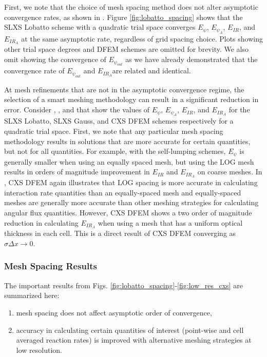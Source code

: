 First, we note that the choice of mesh spacing method does not alter asymptotic convergence rates, as shown in .  Figure \ref{fig:lobatto_spacing} shows that the SLXS Lobatto scheme with a quadratic trial space converges $E_{\psi}$, $E_{\psi_A}$, $E_{IR}$, and $E_{IR_A}$ at the same asymptotic rate, regardless of grid spacing choice.  Plots showing other trial space degrees and DFEM schemes are omitted for brevity.  We also omit showing the convergence of $E_{\psi_{out}}$ as we have already demonstrated that the convergence rate of $E_{\psi_{out}}$ and $E_{IR_A}$are related and identical.

At mesh refinements that are not in the asymptotic convergence regime, the selection of a smart meshing methodology can result in a significant reduction in error.  Consider , , and  that show the values of $E_{\psi}$, $E_{\psi_A}$, $E_{IR}$, and $E_{IR_A}$ for the SLXS Lobatto, SLXS Gauss, and CXS DFEM schemes respectively for a quadratic trial space.
First, we note that any particular mesh spacing methodology results in solutions that are more accurate for certain quantities, but not for all quantities.  
For example, with the self-lumping schemes, $E_{\psi}$ is generally smaller when using an equally spaced mesh, but using the LOG mesh results in orders of magnitude improvement in $E_{IR}$ and $E_{IR_A}$ on coarse meshes.
In , CXS DFEM again illustrates that LOG spacing is more accurate in calculating interaction rate quantities than an equally-spaced mesh and equally-spaced meshes are generally more accurate than other meshing strategies for calculating angular flux quantities.
However, CXS DFEM shows a two order of magnitude reduction in calculating $E_{IR_A}$ when using a mesh that has a uniform optical thickness in each cell.  This is a direct result of CXS DFEM converging as $\hat{\sigma} \Delta x \to 0$.


\subsubsection{Mesh Spacing Results}
\label{sec:mesh_results}
The important results from Figs. \ref{fig:lobatto_spacing}-\ref{fig:low_res_cxs} are summarized here:
\begin{enumerate}
\item mesh spacing does not affect asymptotic order of convergence,
\item accuracy in calculating certain quantities of interest (point-wise and cell averaged reaction rates) is improved with alternative meshing strategies at low resolution.
\end{enumerate}
